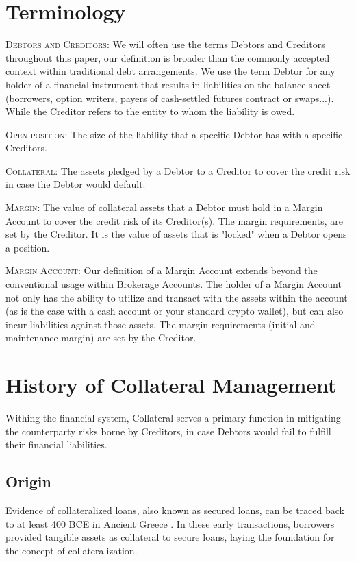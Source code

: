 \documentclass[sigconf,nonacm]{acmart}
\begin{document}
\section{Terminology}
\textsc{Debtors and Creditors:} We will often use the terms Debtors and Creditors throughout this paper,
our definition is broader than the commonly accepted context within traditional debt arrangements.
We use the term Debtor for any holder of a financial instrument that results in liabilities on the balance sheet 
(borrowers, option writers, payers of cash-settled futures contract or swaps...). 
While the Creditor refers to the entity to whom the liability is owed.

\textsc{Open position:} The size of the liability that a specific Debtor has with a specific Creditors.

\textsc{Collateral:} The assets pledged by a Debtor to a Creditor to cover the credit risk in case the Debtor would default.

\textsc{Margin:} The value of collateral assets that a Debtor must hold in a Margin Account to cover the credit risk of its Creditor(s).
The margin requirements, are set by the Creditor.
It is the value of assets that is "locked" when a Debtor opens a position.

\textsc{Margin Account:} Our definition of a Margin Account extends beyond the conventional usage within Brokerage Accounts. 
The holder of a Margin Account not only has the ability to utilize and transact with the assets within the account (as is the case with a cash account or your standard crypto wallet),
but can also incur liabilities against those assets. The margin requirements (initial and maintenance margin) are set by the Creditor.

\section{History of Collateral Management}
\label{subsec:history}

Withing the financial system, Collateral serves a primary function in mitigating the counterparty risks borne by Creditors, in case Debtors would fail to fulfill their financial liabilities.

\subsection{Origin}
Evidence of collateralized loans, also known as secured loans, can be traced back to at least 400 BCE in Ancient Greece \cite{millett2002lending}.
In these early transactions, borrowers provided tangible assets as collateral to secure loans, laying the foundation for the concept of collateralization.
\end{document}
